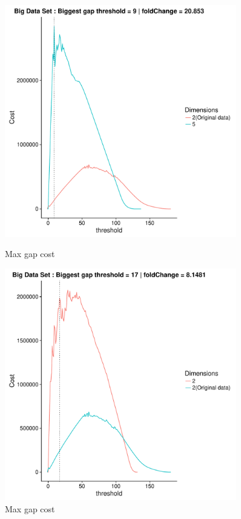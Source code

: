 \documentclass[a4paper,10pt]{article}
\theoremstyle{plain}
\theoremstyle{definition}
\begin{document}
\begin{figure}[H]
	\centering
	\begin{minipage}{0.75\textwidth}
		\centering
		\includegraphics[width=0.9\textwidth]{./plots/plotsCostAndSimAp234/plotBigDataCostAndSim-AP3-S7-K5.pdf}
		\caption{Max gap cost}
		\label{fig:maxGapCostBigDataAp3K5}
	\end{minipage}
	\begin{minipage}{0.75\textwidth}
		\centering
		\includegraphics[width=0.9\textwidth]{./plots/plotsCostAndSimAp234/plotBigDataCostAndSim-AP3-S42-K2.pdf}
		\caption{Max gap cost}
		\label{fig:maxGapCostBigDataAp3K2}
	\end{minipage}
\end{figure}
\end{document}
